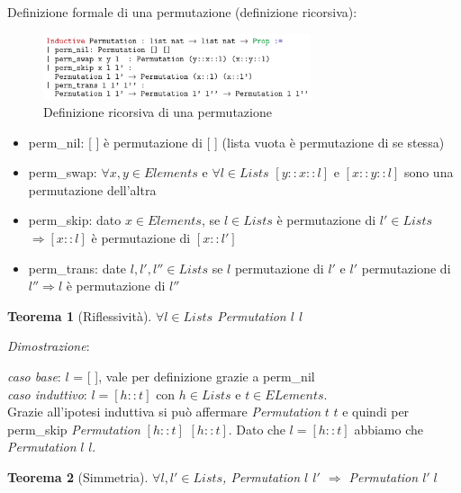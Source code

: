 \documentclass[a4paper]{article}
\newtheorem*{theorem}{Teorema}
\begin{document}
Definizione formale di una permutazione (definizione ricorsiva):
\begin{figure}[!ht]
\centering
\includegraphics[width=0.7\textwidth]{./img/permutazione_ricorsiva.png}
\caption{Definizione ricorsiva di una permutazione} \label{FIG:recursive_permutation1}
\end{figure}
\begin{itemize}
	\item perm\_nil: [ ] è permutazione di [ ] (lista vuota è permutazione di se stessa)
	\item perm\_swap: $\forall x,y \in Elements$ e $\forall l \in Lists$ $[y::x::l]$ e $[x::y::l]$ sono una permutazione dell'altra
	\item perm\_skip: dato $x \in Elements$, se $l \in Lists$ è permutazione di $l' \in Lists$ $\Rightarrow [x::l]$ è permutazione di $[x::l']$
	\item perm\_trans: date $l, l', l'' \in Lists$ se $l$ permutazione di $l'$ e $l'$ permutazione di $l'' \Rightarrow l$ è permutazione di $l''$ 
\end{itemize}
\begin{theorem}[Riflessività] $\forall l \in Lists$ Permutation $l$ $l$\end{theorem}
\textit{Dimostrazione}:
\begin{adjustwidth}{2cm}{}
	\textit{caso base}: $l$ = [ ], vale per definizione grazie a perm\_nil\\
	\textit{caso induttivo}: $l = [h::t]$ con $h \in Lists$ e $t \in ELements$.\\
	Grazie all'ipotesi induttiva si può affermare \textit{Permutation} $t$ $t$ e quindi per perm\_skip \textit{Permutation} $[h::t]$ $[h::t]$. Dato che $l = [h::t]$ abbiamo che \textit{Permutation} $l$ $l$.
\end{adjustwidth}
\begin{theorem}[Simmetria] $\forall l,l' \in Lists$, Permutation $l$ $l'$ $\Rightarrow $ Permutation $l' \; l$\end{theorem}
\end{document}
